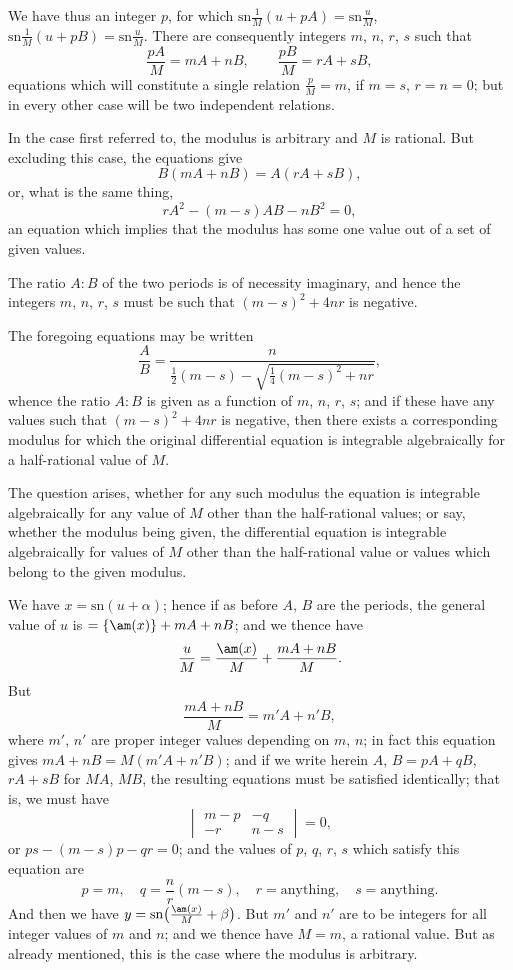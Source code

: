 \documentclass[11pt,a4paper]{book}
\providecommand{\sn}{\mathrm{sn}}
\begin{document}
We have thus an integer $p$, for which $\sn\frac{1}{M}(u + pA) = \sn\frac{u}{M}$, $\sn\frac{1}{M}(u + pB) = \sn\frac{u}{M}$. There are consequently integers $m$, $n$, $r$, $s$ such that
\[
\frac{pA}{M} = mA + nB, \qquad \frac{pB}{M} = rA + sB,
\]
equations which will constitute a single relation $\frac{p}{M} = m$, if $m = s$, $r = n = 0$; but in every other case will be two independent relations.

In the case first referred to, the modulus is arbitrary and $M$ is rational. But excluding this case, the equations give
\[
B(mA + nB) = A(rA + sB),
\]
or, what is the same thing,
\[
rA^2 - (m - s)AB - nB^2 = 0,
\]
an equation which implies that the modulus has some one value out of a set of given values.

The ratio $A : B$ of the two periods is of necessity imaginary, and hence the integers $m$, $n$, $r$, $s$ must be such that $(m - s)^2 + 4nr$ is negative.

The foregoing equations may be written
\[
\frac{A}{B} = \frac{n}{\frac{1}{2}(m - s) - \sqrt{\frac{1}{4}(m - s)^2 + nr}},
\]
whence the ratio $A : B$ is given as a function of $m$, $n$, $r$, $s$; and if these have any values such that $(m - s)^2 + 4nr$ is negative, then there exists a corresponding modulus for which the original differential equation is integrable algebraically for a half-rational value of $M$.

The question arises, whether for any such modulus the equation is integrable algebraically for any value of $M$ other than the half-rational values; or say, whether the modulus being given, the differential equation is integrable algebraically for values of $M$ other than the half-rational value or values which belong to the given modulus.

We have $x = \sn(u + \alpha)$; hence if as before $A$, $B$ are the periods, the general value of $u$ is $= \{\am(x)\} + mA + nB$; and we thence have
\[
\frac{u}{M} = \frac{\am(x)}{M} + \frac{mA + nB}{M}.
\]
But
\[
\frac{mA + nB}{M} = m'A + n'B,
\]
where $m'$, $n'$ are proper integer values depending on $m$, $n$; in fact this equation gives $mA + nB = M(m'A + n'B)$; and if we write herein $A$, $B = pA + qB$, $rA + sB$ for $MA$, $MB$, the resulting equations must be satisfied identically; that is, we must have
\[
\begin{vmatrix} m - p & -q \\ -r & n - s \end{vmatrix} = 0,
\]
or $ps - (m - s)p - qr = 0$; and the values of $p$, $q$, $r$, $s$ which satisfy this equation are
\[
p = m, \quad q = \frac{n}{r}(m - s), \quad r = \text{anything}, \quad s = \text{anything}.
\]
And then we have $y = \sn\bigl(\frac{\am(x)}{M} + \beta\bigr)$. But $m'$ and $n'$ are to be integers for all integer values of $m$ and $n$; and we thence have $M = m$, a rational value. But as already mentioned, this is the case where the modulus is arbitrary.
\end{document}
